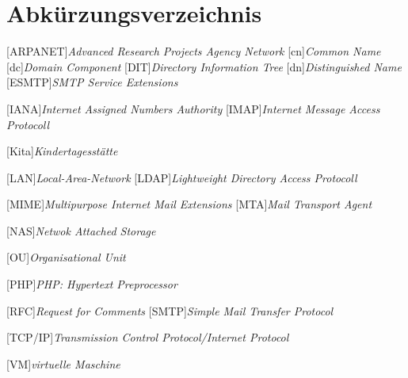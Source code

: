 
\chapter*{Abkürzungsverzeichnis}
\markboth{}{}

\begin{acronym}[]
[ARPANET]{\textit{Advanced Research Projects Agency Network}}
[cn]{\textit{Common Name}}
[dc]{\textit{Domain Component}}
[DIT]{\textit{Directory Information Tree}}
[dn]{\textit{Distinguished Name}}
[ESMTP]{\textit{SMTP Service Extensions}}



[IANA]{\textit{Internet Assigned Numbers Authority}}
[IMAP]{\textit{Internet Message Access Protocoll}}


[Kita]{\textit{Kindertagesstätte}}

[LAN]{\textit{Local-Area-Network}}
[LDAP]{\textit{Lightweight Directory Access Protocoll}}

[MIME]{\textit{Multipurpose Internet Mail Extensions}}
[MTA]{\textit{Mail Transport Agent}}

[NAS]{\textit{Netwok Attached Storage}}

[OU]{\textit{Organisational Unit}}

[PHP]{\textit{PHP: Hypertext Preprocessor}}


[RFC]{\textit{Request for Comments}}
[SMTP]{\textit{Simple Mail Transfer Protocol}}

[TCP/IP]{\textit{Transmission Control Protocol/Internet Protocol}}

[VM]{\textit{virtuelle Maschine}}








\end{acronym}